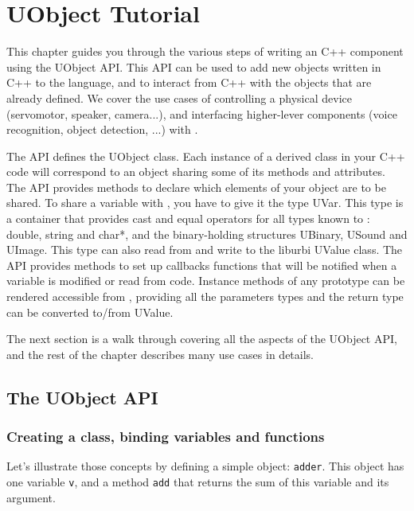 \chapter{UObject Tutorial}

This chapter guides you through the various steps of writing an \urbi
C++ component using the UObject API. This API can be used to add new
objects written in C++ to the \urbi language, and to interact from C++
with the objects that are already defined. We cover the use cases of
controlling a physical device (servomotor, speaker, camera...), and
interfacing higher-lever components (voice recognition, object
detection, ...) with \urbi.

The API defines the UObject class. Each instance of a derived class in
your C++ code will correspond to an \urbi object sharing some of its
methods and attributes. The API provides methods to declare which
elements of your object are to be shared. To share a variable with
\urbi, you have to give it the type UVar. This type is a container that
provides cast and equal operators for all types known to \urbi: double,
string and char*, and the binary-holding structures UBinary, USound
and UImage. This type can also read from and write to the liburbi
UValue class. The API provides methods to set up callbacks functions
that will be notified when a variable is modified or read from \urbi
code. Instance methods of any prototype can be rendered accessible
from \urbi, providing all the parameters types and the return type can
be converted to/from UValue.

The next section is a walk through covering all the aspects of the
UObject API, and the rest of the chapter describes many use cases in
details.

\section{The UObject API}

\subsection{Creating a class, binding variables and functions}

Let's illustrate those concepts by defining a simple object:
\lstinline{adder}. This object has one variable \lstinline{v}, and a
method \lstinline{add} that returns the sum of this variable and its
argument.

